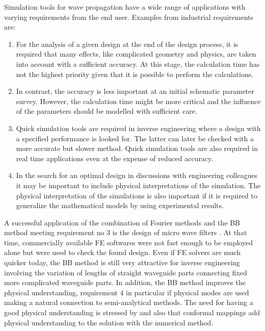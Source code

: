 \documentclass[numreferences]{kluwer}
\begin{document}
Simulation tools for wave propagation have a wide range of
applications with varying requirements from the end user. Examples
from industrial requirements are:
\begin{enumerate}
\item For the analysis of a given design at the end of the design
  process, it is required that many effects, like complicated geometry
  and physics, are taken into account with a sufficient accuracy. At
  this stage, the calculation time has not the highest priority given
  that it is possible to perform the calculations.
\item In contrast, the accuracy is less important at an initial
  schematic parameter survey. However, the calculation time might be
  more critical and the influence of the parameters should be modelled
  with sufficient care.
\item Quick simulation tools are required in inverse engineering where
  a design with a specified performance is looked for. The latter can
  later be checked with a more accurate but slower method. Quick
  simulation tools are also required in real time applications even at
  the expense of reduced accuracy.
\item In the search for an optimal design in discussions with
  engineering colleagues it may be important to include physical
  interpretations of the simulation. The physical interpretation of
  the simulations is also important if it is required to generalize
  the mathematical models by using experimental results.

\end{enumerate}

A successful application of the combination of Fourier methods and the
BB method meeting requirement no 3 is the design of micro wave filters
\cite{bironilsson2005}. At that time, commercially available FE
softwares were not fast enough to be employed alone but were used to
check the found design. Even if FE solvers are much quicker today, the
BB method is still very attractive for inverse engineering involving
the variation of lengths of straight waveguide parts connecting fixed
more complicated waveguide parts. In addition, the BB method improves
the physical understanding, requirement 4 in particular if physical
modes are used making a natural connection to semi-analytical
methods. The need for having a good physical understanding is stressed
by \cite{nachbin+daSilvaSimoes:2012} and also that conformal mappings
add physical understanding to the solution with the numerical method.
\end{document}
